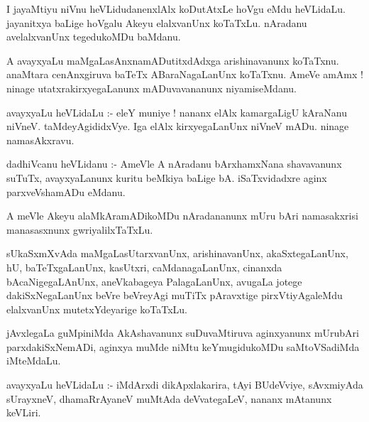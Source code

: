 \documentclass{article}
\begin{document}
\begin{mn}
I  jayaMtiyu  niVnu  heVLidudanenxlAlx  koDutAtxLe  hoVgu  eMdu  heVLidaLu.  jayanitxya  baLige  hoVgalu  
Akeyu  elalxvanUnx  koTaTxLu.  nAradanu avelalxvanUnx  tegedukoMDu  baMdanu.
\end{mn}

\begin{mn}
A  avayxyaLu  maMgaLasAnxnamADutitxdAdxga  arishinavanunx  koTaTxnu.  anaMtara  cenAnxgiruva  baTeTx  
ABaraNagaLanUnx  koTaTxnu.  AmeVe  amAmx !  ninage  utatxrakirxyegaLanunx  mADuvavananunx  niyamiseMdanu.
\end{mn}

\begin{mn}
avayxyaLu  heVLidaLu :- eleY  muniye !  nananx  elAlx  kamargaLigU  kAraNanu  niVneV. taMdeyAgididxVye.  
Iga  elAlx  kirxyegaLanUnx  niVneV  mADu.  ninage  namasAkxravu.
\end{mn}

\begin{mn}
dadhiVcanu  heVLidanu :- AmeVle  A  nAradanu  bArxhamxNana  shavavanunx  suTuTx,  avayxyaLanunx  kuritu  
beMkiya  baLige  bA.  iSaTxvidadxre  aginx parxveVshamADu  eMdanu.
\end{mn}

\begin{mn}
A  meVle  Akeyu  alaMkAramADikoMDu  nAradananunx  mUru bAri  namasakxrisi  manasasxnunx  gwriyalilxTaTxLu.
\end{mn}

\begin{mn}
sUkaSxmXvAda  maMgaLasUtarxvanUnx,  arishinavanUnx,  akaSxtegaLanUnx,  hU,  baTeTxgaLanUnx,  kasUtxri,  
caMdanagaLanUnx,  cinanxda  bAcaNigegaLAnUnx,  aneVkabageya  PalagaLanUnx,  avugaLa  jotege  dakiSxNegaLanUnx  
beVre beVreyAgi  muTiTx  pAravxtige  pirxVtiyAgaleMdu  elalxvanUnx  mutetxYdeyarige  koTaTxLu.
\end{mn}

\begin{mn}
jAvxlegaLa  guMpiniMda  AkAshavanunx  suDuvaMtiruva  aginxyanunx  mUrubAri  parxdakiSxNemADi,  aginxya  muMde  
niMtu  keYmugidukoMDu  saMtoVSadiMda  iMteMdaLu.
\end{mn}

\begin{mn}
avayxyaLu  heVLidaLu :- iMdArxdi  dikApxlakarira,  tAyi  BUdeVviye,  sAvxmiyAda  sUrayxneV,  dhamaRrAyaneV  
muMtAda  deVvategaLeV,  nananx  mAtanunx  keVLiri.
\end{mn}
\end{document}
